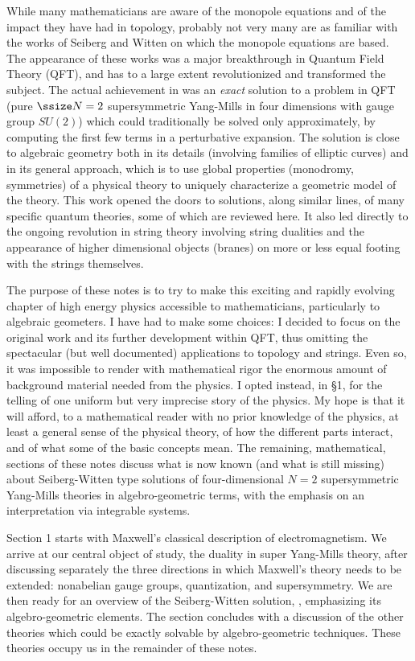 While many mathematicians are aware of the monopole equations 
\cite{W}  and of the impact they have had in topology, probably 
not very many are as familiar with the works  \cite{SW1, SW2} 
of Seiberg and Witten on which the monopole equations are based. 
The appearance of these works was a major breakthrough in Quantum 
Field Theory (QFT), and has to a large extent revolutionized and 
transformed the subject. The actual achievement in \cite{SW1} 
was an {\it exact}
solution to a problem in QFT (pure $\ssize N=2$ supersymmetric
Yang-Mills in four dimensions with gauge group $SU(2)$)
which could traditionally be solved only approximately, by
computing the first few terms in a perturbative expansion.
The solution is close to algebraic geometry both in its
details (involving families of elliptic curves) and in its
general approach, which is to use global properties
(monodromy, symmetries) of a physical theory to uniquely
characterize a geometric model of the theory. 
This work opened the doors to solutions, along similar
lines, of many specific quantum theories, some of which are
reviewed here.
It also led directly to the ongoing revolution in string
theory involving string dualities and the appearance of
higher dimensional objects (branes) on more or less equal
footing with the strings themselves.

The purpose of these notes is to try to make this exciting
and rapidly evolving chapter of high energy physics
accessible to mathematicians, particularly to algebraic
geometers.
I have had to make some choices: I decided to focus on the
original work and its further development within QFT, thus
omitting the spectacular (but well documented) applications
to topology and strings.
Even so, it was impossible to render with mathematical rigor
the enormous amount of background material needed from the
physics.
I opted instead, in \S1, for the telling of one uniform but
very imprecise story of the physics.
My hope is that it will afford, to a mathematical reader
with no prior knowledge of the physics, at least a general
sense of the physical theory, of how the different parts
interact, and of what some of the basic concepts mean.
The remaining, mathematical, sections of these notes
discuss what is now known (and what is still missing) about
Seiberg-Witten type solutions of four-dimensional $N=2$
supersymmetric Yang-Mills theories in algebro-geometric
terms, with the emphasis on an interpretation via integrable
systems.

Section 1 starts with Maxwell's classical description of
electromagnetism.
We arrive at our central object of study, the duality in
super Yang-Mills theory, after discussing separately the
three directions in which Maxwell's theory needs to be
extended: nonabelian gauge groups, quantization, and
supersymmetry.
We are then ready for an overview of the Seiberg-Witten
solution, \cite{SW1}, emphasizing its algebro-geometric elements.
The section concludes with a discussion of the other
theories which could be exactly solvable by
algebro-geometric techniques.
These theories occupy us in the remainder of these notes.

